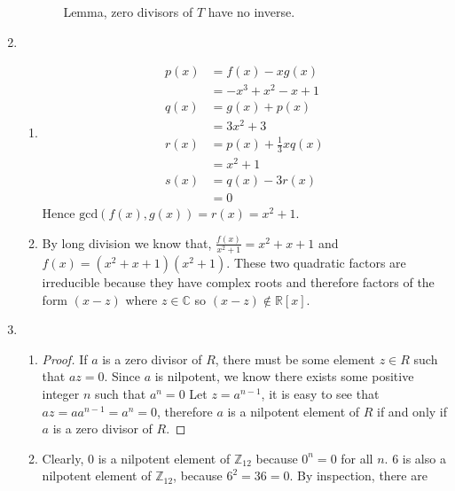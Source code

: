 \documentclass[10pt]{article}
\begin{document}
\begin{enumerate}
\begin{enumerate}
\begin{enumerate}[(i)]
              Lemma, zero divisors of $T$ have no inverse.
          \end{enumerate}
      \end{enumerate}
        \item 
          \begin{enumerate}
            \item
              \begin{align*}
                p(x) &= f(x) - xg(x) \\
                     &= -x^3 + x^2 - x + 1 \\
                q(x) &= g(x) + p(x) \\
                     &= 3x^2 + 3 \\
                r(x) &= p(x) + \tfrac{1}{3}xq(x) \\
                     &= x^2 + 1 \\
                s(x) &= q(x) - 3r(x) \\
                     &= 0
              \end{align*}
              Hence $\text{gcd}(f(x),g(x)) = r(x) = x^2 + 1$.
            \item By long division we know that, $\tfrac{f(x)}{x^2 +1} = x^2 +
              x + 1$ and $f(x) = (x^2 + x + 1)(x^2 + 1)$. These two quadratic
              factors are irreducible because they have complex roots and
              therefore factors of the form $(x - z)$ where $z \in \mathbb{C}$
              so $(x - z) \not \in \mathbb{R}[x]$.
          \end{enumerate}
          \pagebreak
        \item
          \begin{enumerate}
            \item
              \begin{proof}
                If $a$ is a zero divisor of $R$, there must be some element
                $z \in R$ such that $az = 0$. Since $a$ is nilpotent, we know
                there exists some positive integer $n$ such that $a^n = 0$ Let
                $z = a^{n-1}$, it is easy to see that $az=aa^{n-1}=a^n=0$,
                therefore $a$ is a nilpotent element of $R$ if and only if $a$
                is a zero divisor of $R$.
              \end{proof}
            \item Clearly, 0 is a nilpotent element of $\mathbb{Z}_{12}$
              because $0^n = 0$ for all $n$. 6 is also a nilpotent element of
              $\mathbb{Z}_{12}$, because $6^2=36=0$. By inspection, there are

\end{enumerate}
\end{enumerate}
\end{document}
